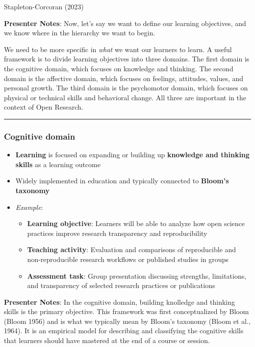 \documentclass[
  letterpaper,
  DIV=11,
  numbers=noendperiod]{scrartcl}
\providecommand{\tightlist}{%
  \setlength{\itemsep}{0pt}\setlength{\parskip}{0pt}}
\begin{document}
Stapleton-Corcoran (2023)

\textbf{Presenter Notes}: Now, let's say we want to define our learning
objectives, and we know where in the hierarchy we want to begin.

We need to be more specific in \emph{what} we want our learners to
learn. A useful framework is to divide learning objectives into three
domains. The first domain is the cognitive domain, which focuses on
knowledge and thinking. The second domain is the affective domain, which
focuses on feelings, attitudes, values, and personal growth. The third
domain is the psychomotor domain, which focuses on physical or technical
skills and behavioral change. All three are important in the context of
Open Research.

\begin{center}\rule{0.5\linewidth}{0.5pt}\end{center}

\subsubsection{Cognitive domain}\label{cognitive-domain}

\begin{itemize}
\item
  \textbf{Learning} is focused on expanding or building up
  \textbf{knowledge and thinking skills} as a learning outcome
\item
  Widely implemented in education and typically connected to
  \textbf{Bloom's taxonomy}
\item
  \emph{Example}:

  \begin{itemize}
  \tightlist
  \item
    \textbf{Learning objective}: Learners will be able to analyze how
    open science practices improve research transparency and
    reproducibility
  \item
    \textbf{Teaching activity}: Evaluation and comparisons of
    reproducible and non-reproducible research workflows or published
    studies in groups
  \item
    \textbf{Assessment task}: Group presentation discussing strengths,
    limitations, and transparency of selected research practices or
    publications
  \end{itemize}
\end{itemize}

\textbf{Presenter Notes}: In the cognitive domain, building knolledge
and thinking skills is the primary objective. This framework was first
conceptualized by Bloom (Bloom 1956) and is what we typically mean by
Bloom's taxonomy ({Bloom et al.}, 1964). It is an empirical model for
describing and classifying the cognitive skills that learners should
have mastered at the end of a course or session.
\end{document}
